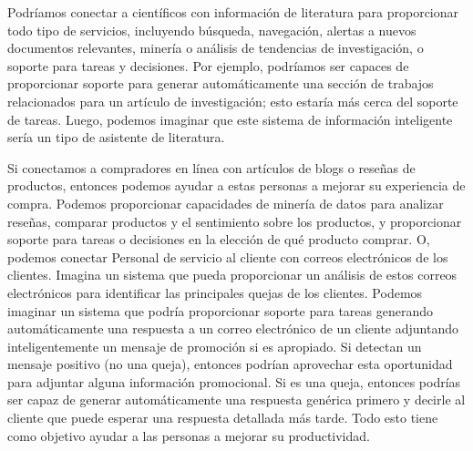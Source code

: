Podríamos conectar a científicos con información de literatura para proporcionar todo tipo de servicios, incluyendo búsqueda, navegación, alertas a nuevos documentos relevantes, minería o análisis de tendencias de investigación, o soporte para tareas y decisiones. Por ejemplo, podríamos ser capaces de proporcionar soporte para generar automáticamente una sección de trabajos relacionados para un artículo de investigación; esto estaría más cerca del soporte de tareas. Luego, podemos imaginar que este sistema de información inteligente sería un tipo de asistente de literatura.

Si conectamos a compradores en línea con artículos de blogs o reseñas de productos, entonces podemos ayudar a estas personas a mejorar su experiencia de compra. Podemos proporcionar capacidades de minería de datos para analizar reseñas, comparar productos y el sentimiento sobre los productos, y proporcionar soporte para tareas o decisiones en la elección de qué producto comprar. O, podemos conectar Personal de servicio al cliente con correos electrónicos de los clientes. Imagina un sistema que pueda proporcionar un análisis de estos correos electrónicos para identificar las principales quejas de los clientes. Podemos imaginar un sistema que podría proporcionar soporte para tareas generando automáticamente una respuesta a un correo electrónico de un cliente adjuntando inteligentemente un mensaje de promoción si es apropiado. Si detectan un mensaje positivo (no una queja), entonces podrían aprovechar esta oportunidad para adjuntar alguna información promocional. Si es una queja, entonces podrías ser capaz de generar automáticamente una respuesta genérica primero y decirle al cliente que puede esperar una respuesta detallada más tarde. Todo esto tiene como objetivo ayudar a las personas a mejorar su productividad.

